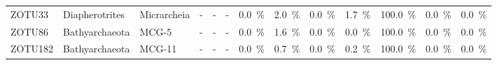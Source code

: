\begin{table}
\begin{adjustbox}{max width=0.8\textwidth, max totalheight=0.85\textheight, keepaspectratio}
\begin{tabular}{llllllllll||lll}
ZOTU33 & Diapherotrites & Micrarcheia & - & - & - & \SI{0.0}{\percent} & \SI{2.0}{\percent} & \SI{0.0}{\percent} & \SI{1.7}{\percent} & \SI{100.0}{\percent} & \SI{0.0}{\percent} & \SI{0.0}{\percent} \\
ZOTU86 & Bathyarchaeota & MCG-5 & - & - & - & \SI{0.0}{\percent} & \SI{1.6}{\percent} & \SI{0.0}{\percent} & \SI{0.0}{\percent} & \SI{100.0}{\percent} & \SI{0.0}{\percent} & \SI{0.0}{\percent} \\
ZOTU182 & Bathyarchaeota & MCG-11 & - & - & - & \SI{0.0}{\percent} & \SI{0.7}{\percent} & \SI{0.0}{\percent} & \SI{0.2}{\percent} & \SI{100.0}{\percent} & \SI{0.0}{\percent} & \SI{0.0}{\percent} \\
\bottomrule
\end{tabular}
\end{adjustbox}
\end{table}

